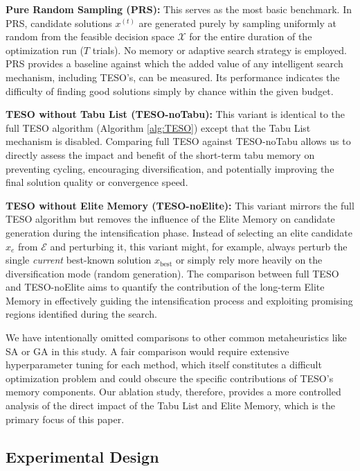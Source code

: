 \documentclass{article}
\begin{document}
    \noindent \textbf{Pure Random Sampling (PRS):} This serves as the most basic benchmark. In PRS, candidate solutions $x^{(t)}$ are generated purely by sampling uniformly at random from the feasible decision space $\mathcal{X}$ for the entire duration of the optimization run ($T$ trials). No memory or adaptive search strategy is employed. PRS provides a baseline against which the added value of any intelligent search mechanism, including TESO's, can be measured. Its performance indicates the difficulty of finding good solutions simply by chance within the given budget.

    \noindent \textbf{TESO without Tabu List (TESO-noTabu):} This variant is identical to the full TESO algorithm (Algorithm \ref{alg:TESO}) except that the Tabu List mechanism is disabled. Comparing full TESO against TESO-noTabu allows us to directly assess the impact and benefit of the short-term tabu memory on preventing cycling, encouraging diversification, and potentially improving the final solution quality or convergence speed.

    \noindent \textbf{TESO without Elite Memory (TESO-noElite):} This variant mirrors the full TESO algorithm but removes the influence of the Elite Memory on candidate generation during the intensification phase. Instead of selecting an elite candidate $x_e$ from $\mathcal{E}$ and perturbing it, this variant might, for example, always perturb the single \textit{current} best-known solution $x_{\text{best}}$ or simply rely more heavily on the diversification mode (random generation). The comparison between full TESO and TESO-noElite aims to quantify the contribution of the long-term Elite Memory in effectively guiding the intensification process and exploiting promising regions identified during the search.

We have intentionally omitted comparisons to other common metaheuristics like SA or GA in this study. A fair comparison would require extensive hyperparameter tuning for each method, which itself constitutes a difficult optimization problem and could obscure the specific contributions of TESO's memory components. Our ablation study, therefore, provides a more controlled analysis of the direct impact of the Tabu List and Elite Memory, which is the primary focus of this paper.

\subsection{Experimental Design}
\label{subsec:exp_design}
\end{document}
